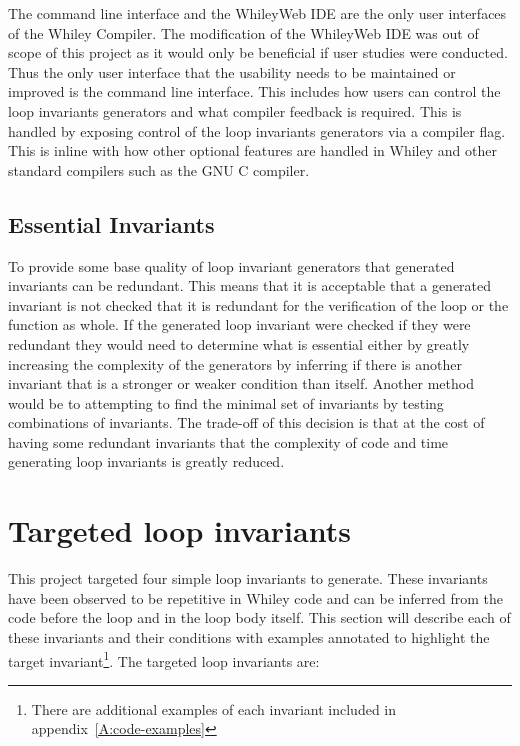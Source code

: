 The command line interface and the WhileyWeb IDE are the only user interfaces
of the Whiley Compiler.
The modification of the WhileyWeb IDE was out of scope of this project as it
would only be beneficial if user studies were conducted.
Thus the only user interface that the usability needs to be maintained or
improved is the command line interface.
This includes how users can control the loop invariants generators and what
compiler feedback is required.
This is handled by exposing control of the loop invariants generators via
a compiler flag.
This is inline with how other optional features are handled in Whiley and
other standard compilers such as the GNU C compiler.

\subsection{Essential Invariants}\label{s:essential-inv}

To provide some base quality of loop invariant generators that generated invariants 
can be redundant.
This means that it is acceptable that a generated invariant is not
checked that it is redundant for the verification of the loop or the function
as whole.
If the generated loop invariant were checked if they were redundant
they would need to determine what is essential either by greatly increasing
the complexity of the generators by inferring if there is another invariant
that is a stronger or weaker condition than itself.
Another method would be to attempting to find the
minimal set of invariants by testing combinations of invariants.
The trade-off of this decision is that at the cost of having some redundant
invariants that the complexity of code and time generating loop invariants is
greatly reduced.

\section{Targeted loop invariants}\label{s:target-loop-inv}

This project targeted four simple loop invariants to generate.
These invariants have been observed to be repetitive in Whiley code and 
can be inferred from the code before the loop and  in the loop body itself.
This section will describe each of these invariants and their conditions
with examples annotated to highlight the target invariant\footnote{There are additional examples of each invariant included in appendix~\ref{A:code-examples}}.
The targeted loop invariants are:

